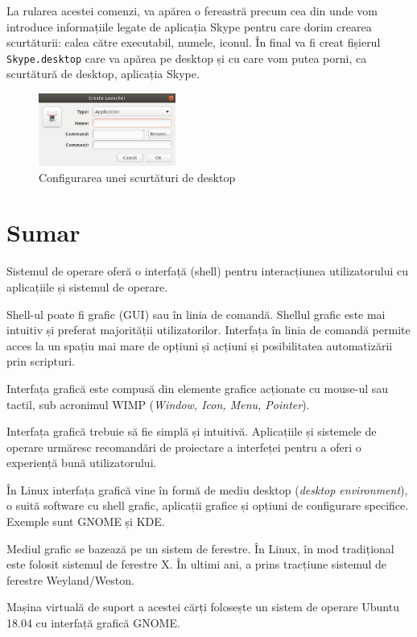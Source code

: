 
La rularea acestei comenzi, va apărea o fereastră precum cea din  unde vom introduce informațiile legate de aplicația Skype pentru care dorim crearea scurtăturii: calea către executabil, numele, iconul. În final va fi creat fișierul \texttt{Skype.desktop} care va apărea pe desktop și cu care vom putea porni, ca scurtătură de desktop, aplicația Skype.

\begin{figure}[!htbp]
  \centering
  \includegraphics[width=0.4\textwidth]{chapters/01-ui/img/desktop-shortcut.png}
  \caption{Configurarea unei scurtături de desktop}
  \label{fig:ui:desktop-shortcut}
\end{figure}

\section{Sumar}
\label{sec:ui:summary}

Sistemul de operare oferă o interfață (shell) pentru interacțiunea utilizatorului cu aplicațiile și sistemul de operare.

Shell-ul poate fi grafic (GUI) sau în linia de comandă. Shellul grafic este mai intuitiv și preferat majorității utilizatorilor. Interfața în linia de comandă permite acces la un spațiu mai mare de opțiuni și acțiuni și posibilitatea automatizării prin scripturi.

Interfața grafică este compusă din elemente grafice acționate cu mouse-ul sau tactil, sub acronimul WIMP (\textit{Window, Icon, Menu, Pointer}).

Interfața grafică trebuie să fie simplă și intuitivă. Aplicațiile și sistemele de operare urmăresc recomandări de proiectare a interfeței pentru a oferi o experiență bună utilizatorului.

În Linux interfața grafică vine în formă de mediu desktop (\textit{desktop environment}), o suită software cu shell grafic, aplicații grafice și opțiuni de configurare specifice. Exemple sunt GNOME și KDE.

Mediul grafic se bazează pe un sistem de ferestre. În Linux, în mod tradițional este folosit sistemul de ferestre X. În ultimi ani, a prins tracțiune sistemul de ferestre Weyland/Weston.

Mașina virtuală de suport a acestei cărți folosește un sistem de operare Ubuntu 18.04 cu interfață grafică GNOME.
